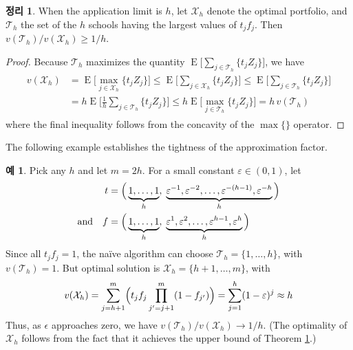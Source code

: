 \documentclass[12pt]{article} %
\newtheorem{theorem}{Theorem}
\theoremstyle{definition}
\newtheorem{example}{Example}
\newtheorem{theorem}{정리}
\theoremstyle{definition}
\newtheorem{example}{예}
\begin{document}
\begin{theorem} \label{oneoverhopt}
When the application limit is $h$, let $\mathcal{X}_h$ denote the optimal portfolio, and $\mathcal{T}_h$ the set of the $h$ schools having the largest values of $t_j f_j$. Then $v(\mathcal{T}_h) / v(\mathcal{X}_h) \geq 1/h$. 
\end{theorem}
\begin{proof}
Because $\mathcal{T}_h$ maximizes the quantity $\operatorname{E}\bigl[ \sum_{j \in \mathcal{T}_h}\{ t_j Z_j \}\bigr]$, we have
\begin{align} \label{oneoverhopt}
\begin{split}
v(\mathcal{X}_h) &= \operatorname{E}\bigl[ \max_{j \in \mathcal{X}_h}\{ t_j Z_j \}\bigr] \leq \operatorname{E}\bigl[ \sum_{j \in \mathcal{X}_h}\{ t_j Z_j \}\bigr] \leq \operatorname{E}\bigl[ \sum_{j \in \mathcal{T}_h}\{ t_j Z_j \}\bigr] \\
&= h  \operatorname{E}\bigl[ \tfrac{1}{h} \sum_{j \in \mathcal{T}_h}\{ t_j Z_j \}\bigr]
\leq h  \operatorname{E}\bigl[ \max_{j \in \mathcal{T}_h}\{ t_j Z_j \}\bigr]
= h\,v(\mathcal{T}_h)
\end{split}
\end{align}
where the final inequality follows from the concavity of the $\max\{\}$ operator.
\end{proof}

The following example establishes the tightness of the approximation factor. 

\begin{example} \label{tightexampleforoneoverhopt}
Pick any $h$ and let $m = 2h$. For a small constant $\varepsilon \in (0, 1)$, let
\begin{align*}
t &= \Bigl(\,\underbrace{1,  \dots, 1}_{h},\;
\underbrace{\varepsilon^{-1}, \varepsilon^{-2}, \dots, \varepsilon^{-(h-1)}, \varepsilon^{-h}}_{h}\,\Bigr) \\
\text{and}\quad f &= \Bigl(\,\underbrace{1,  \dots, 1}_{h},\;
\underbrace{\varepsilon^{1}, \varepsilon^{2}, \dots, \varepsilon^{h-1}, \varepsilon^{h}}_{h}\,\Bigr)
\end{align*}
Since all $t_j f_j = 1$, the na\"ive algorithm can choose $\mathcal{T}_h = \{1, \dots, h\}$, with $v(\mathcal{T}_h) = 1$. But optimal solution is $\mathcal{X}_h = \{h+1, \dots, m\}$, with
\begin{equation*}
v(\mathcal{X}_h) = \sum_{j= h +1}^m \Bigl( t_j f_j \prod_{j' = j+1}^m (1 - f_{j'}) \Bigr) =  \sum_{j= 1}^h  (1 - \varepsilon)^{j} \approx h
\end{equation*}
Thus, as $\epsilon$ approaches zero, we have $v(\mathcal{T}_h) / v(\mathcal{X}_h) \to 1/h$. (The optimality of $\mathcal{X}_h$ follows from the fact that it achieves the upper bound of Theorem \ref{oneoverhopt}.)
\end{example}
\end{document}
